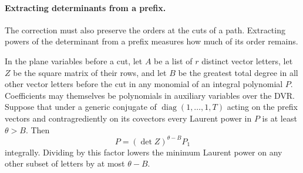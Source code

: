 \paragraph{Extracting determinants from a prefix.}

The correction must also preserve the orders at the cuts of a path. Extracting powers of the determinant from a prefix measures how much of its order remains.

\begin{lemma}\label{lem:plane-prefix-determinant}
In the plane variables
before a cut, let \(A\) be a list of \(r\) distinct vector
letters, let \(Z\) be the square matrix of their rows, and
let \(B\) be the greatest total degree in all other vector
letters before the cut in any monomial of an integral polynomial
\(P\). Coefficients may themselves be polynomials in auxiliary
variables over the DVR. Suppose that under a generic conjugate
of \(\operatorname{diag}(1,\ldots,1,T)\) acting on the prefix
vectors and contragrediently on its covectors every Laurent
power in \(P\) is at least \(\theta>B\). Then
\[
                    P=(\det Z)^{\theta-B}P_1
\]
integrally. Dividing by this factor lowers the minimum Laurent
power on any other subset of letters by at most \(\theta-B\).
\end{lemma}


